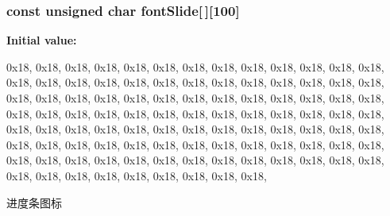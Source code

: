 \hypertarget{group___w_i_d_g_e_t_ga934307f74cc38f1062d272ab796d7715}{
\subsubsection[{font\-Slide}]{\setlength{\rightskip}{0pt plus 5cm}const unsigned char {\bf font\-Slide}\mbox{[}$\,$\mbox{]}\mbox{[}100\mbox{]}}}\label{group___w_i_d_g_e_t_ga934307f74cc38f1062d272ab796d7715}
{\bfseries \-Initial value\-:}
\begin{DoxyCode}
 
{ 
    0x18, 0x18, 0x18, 0x18, 0x18, 0x18, 0x18, 0x18, 0x18, 0x18,
    0x18, 0x18, 0x18, 0x18, 0x18, 0x18, 0x18, 0x18, 0x18, 0x18,
    0x18, 0x18, 0x18, 0x18, 0x18, 0x18, 0x18, 0x18, 0x18, 0x18,
    0x18, 0x18, 0x18, 0x18, 0x18, 0x18, 0x18, 0x18, 0x18, 0x18,
    0x18, 0x18, 0x18, 0x18, 0x18, 0x18, 0x18, 0x18, 0x18, 0x18,
    0x18, 0x18, 0x18, 0x18, 0x18, 0x18, 0x18, 0x18, 0x18, 0x18,
    0x18, 0x18, 0x18, 0x18, 0x18, 0x18, 0x18, 0x18, 0x18, 0x18,
    0x18, 0x18, 0x18, 0x18, 0x18, 0x18, 0x18, 0x18, 0x18, 0x18,
    0x18, 0x18, 0x18, 0x18, 0x18, 0x18, 0x18, 0x18, 0x18, 0x18,
    0x18, 0x18, 0x18, 0x18, 0x18, 0x18, 0x18, 0x18, 0x18, 0x18, 
}
\end{DoxyCode}


进度条图标 

